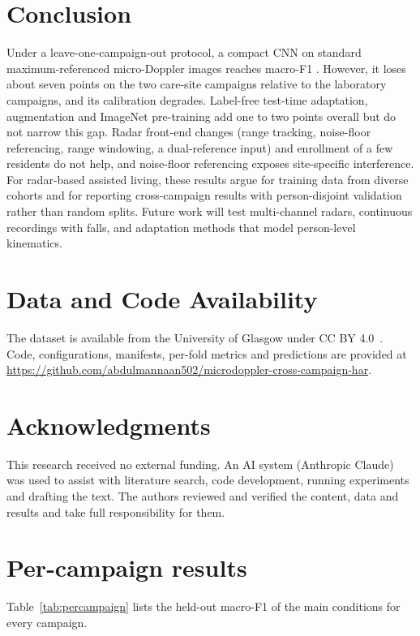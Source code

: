 \documentclass[11pt,a4paper]{article}
\begin{document}
\section{Conclusion}
Under a leave-one-campaign-out protocol, a compact CNN on standard maximum-referenced micro-Doppler images reaches macro-F1 \PROTLOCO{}. However, it loses about seven points on the two care-site campaigns relative to the laboratory campaigns, and its calibration degrades. Label-free test-time adaptation, augmentation and ImageNet pre-training add one to two points overall but do not narrow this gap. Radar front-end changes (range tracking, noise-floor referencing, range windowing, a dual-reference input) and enrollment of a few residents do not help, and noise-floor referencing exposes site-specific interference. For radar-based assisted living, these results argue for training data from diverse cohorts and for reporting cross-campaign results with person-disjoint validation rather than random splits. Future work will test multi-channel radars, continuous recordings with falls, and adaptation methods that model person-level kinematics.

\section*{Data and Code Availability}
The dataset is available from the University of Glasgow under CC BY 4.0~\cite{gla848}. Code, configurations, manifests, per-fold metrics and predictions are provided at \url{https://github.com/abdulmannaan502/microdoppler-cross-campaign-har}.

\section*{Acknowledgments}
This research received no external funding. An AI system (Anthropic Claude) was used to assist with literature search, code development, running experiments and drafting the text. The authors reviewed and verified the content, data and results and take full responsibility for them.


\appendix
\section{Per-campaign results}
Table~\ref{tab:percampaign} lists the held-out macro-F1 of the main conditions for every campaign.

\end{document}
